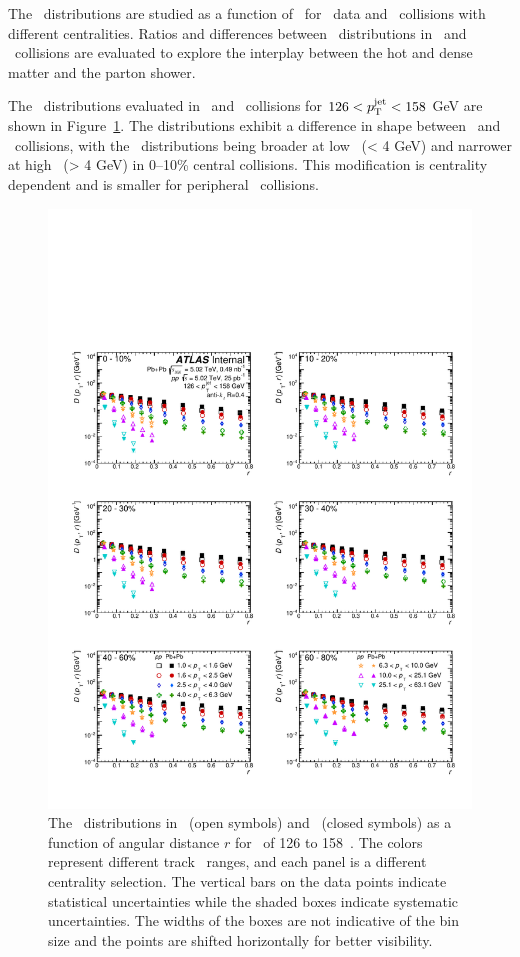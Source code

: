 
The \Dptr\ distributions are studied as a function of \ptjet\ for \pp\ data and \PbPb\ collisions with different centralities. Ratios and differences between \Dptr\ distributions in \pbpb\ and \pp\ collisions are evaluated to explore the interplay between the hot and dense matter and the parton shower.

The \Dptr\ distributions evaluated in \pp\ and \pbpb\ collisions for $126 < \mbox{$p_{\mathrm{T}}^{\mathrm{jet}}$} < 158$ GeV are shown in Figure~\ref{fig:dptr}. The distributions exhibit a difference in shape between \PbPb\ and \pp\ collisions, 
with the \pbpb\ distributions being broader at low \pt\ (\pt < 4 GeV) and narrower at high \pt\ (\pt > 4 GeV) in \mbox{0--10\%} central collisions. This modification is centrality dependent and is smaller for peripheral \pbpb\ collisions.

\begin{figure}[h]
\centerline{
            \includegraphics[width=1\textwidth]{figures/results/DpT_dR_jet7.pdf} 
      }
\caption{The \Dptr\ distributions in \pp\ (open symbols) and \pbpb\ (closed symbols) as a function of angular distance $r$ for \ptjet\ of 126 to 158~\GeV. The colors represent different track \pt\ ranges, and each panel is a different centrality selection. The vertical bars on the data points indicate statistical uncertainties while the shaded boxes indicate systematic uncertainties. The widths of the boxes are not indicative of the bin size and the points are shifted horizontally for better visibility.}
\label{fig:dptr}
\end{figure}



